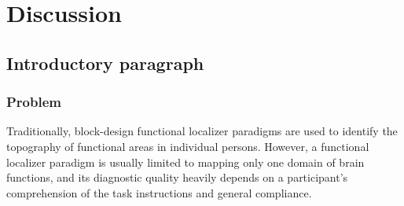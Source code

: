 \section{Discussion}

\subsection{Introductory paragraph}

\begin{comment}

\subsubsection{Longer version of the introductory paragraph}
%
We investigated the performance of a functional alignment procedure that we used
to predict results of $t$-contrasts (i.e. the criteria) that were created in
previous studies \citep{sengupta2016extension, haeusler2022processing} in order
to localize the \ac{ppa}.
%
Following a leave-one-subject-out cross-validation, we fit a \acf{srm}
\citep{chen2015reduced} to the training subjects' concatenated response
time series of three different paradigms in order to create a multi-paradigm
\acf{cfs} and the training subjects' subject-specific transformations.
%
In order to acquire the test subject's transformation, we used an
increasing amount of the test subject's response time series of the three
paradigms (i.e. the predictors) separately by functionally aligning the test
subject to the corresponding \acp{tr} of the shared feature space (i.e.
\ac{cfs}).
%
The empirical $Z$-maps of each training subject were projected from their
respective voxel space through the \ac{cfs} into the test subject's voxel space
to yield the test subject's predicted $Z$-maps.
%
In case of the anatomical alignment approach that served as a baseline, the
training subjects' $Z$-maps were projected via nonlinear, volume-based
transformation through the MNI space into the test subject's voxel
space.

\end{comment}


\subsubsection{Problem}
%
Traditionally, block-design functional localizer paradigms are used to identify
the topography of functional areas in individual persons.
%
However, a functional localizer paradigm is usually limited to mapping only one
domain of brain functions, and its diagnostic quality heavily depends on a
participant's comprehension of the task instructions and general compliance.


